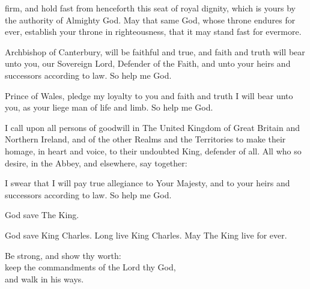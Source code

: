 {



 firm, and hold fast from henceforth this seat of royal dignity, which
is yours by the authority of Almighty God.
May that same God, whose throne endures for ever, establish your throne
in righteousness, that it may stand fast for evermore.


\vfill 
{}


 Archbishop of Canterbury,
will be faithful and true,
and faith and truth will bear unto you,
our Sovereign Lord, Defender of the Faith, and unto your heirs and
successors according to law.
So help me God.


\vfill 
{}



 Prince of Wales,
pledge my loyalty to you
and faith and truth I will bear unto you,
as your liege man of life and limb.
So help me God.
\vfill 


 I call upon all persons of goodwill in The United Kingdom of Great Britain
and Northern Ireland, and of the other Realms and the Territories to make
their homage, in heart and voice, to their undoubted King, defender of all.
All who so desire, in the Abbey, and elsewhere, say together:


I swear that I will pay true allegiance to Your Majesty,
and to your heirs and successors according to law. So help me God.
\vfill 


\clearpage 
{}
God save The King.


God save King Charles.
Long live King Charles.
May The King live for ever.


\vfill 
{}


\begin{center}
Be strong, and show thy worth:\\ keep the commandments
of the Lord thy God,\\ and walk in his ways.
\end{center}

}

